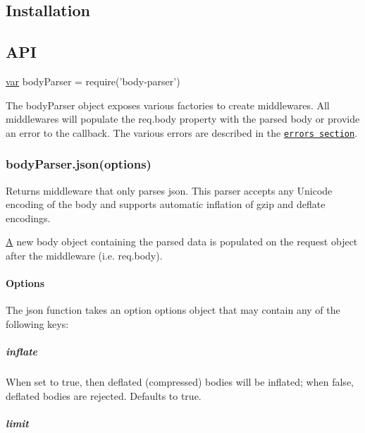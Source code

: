 \subsection*{Installation}




\subsection*{A\+P\+I}


\begin{DoxyCode}
\hyperlink{018__def_8c_a335628f2e9085305224b4f9cc6e95ed5}{var} bodyParser = require(\textcolor{stringliteral}{'body-parser'})
\end{DoxyCode}


The {\ttfamily body\+Parser} object exposes various factories to create middlewares. All middlewares will populate the {\ttfamily req.\+body} property with the parsed body or provide an error to the callback. The various errors are described in the \href{#errors}{\tt errors section}.

\subsubsection*{body\+Parser.\+json(options)}

Returns middleware that only parses {\ttfamily json}. This parser accepts any Unicode encoding of the body and supports automatic inflation of {\ttfamily gzip} and {\ttfamily deflate} encodings.

\hyperlink{class_a}{A} new {\ttfamily body} object containing the parsed data is populated on the {\ttfamily request} object after the middleware (i.\+e. {\ttfamily req.\+body}).

\paragraph*{Options}

The {\ttfamily json} function takes an option {\ttfamily options} object that may contain any of the following keys\+:

\subparagraph*{inflate}

When set to {\ttfamily true}, then deflated (compressed) bodies will be inflated; when {\ttfamily false}, deflated bodies are rejected. Defaults to {\ttfamily true}.

\subparagraph*{limit}

